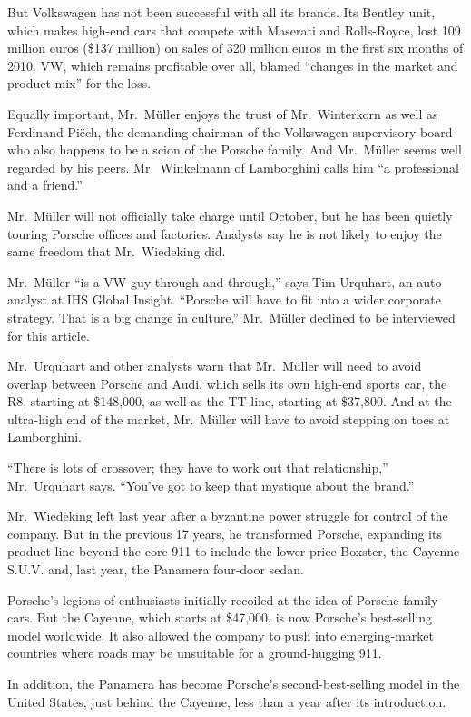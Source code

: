 ﻿\documentclass[12pt]{article}
\begin{document}
But Volkswagen has not been successful with all its brands. Its Bentley unit, which makes high-end
cars that compete with Maserati and Rolls-Royce, lost 109 million euros (\$137 million) on sales of
320 million euros in the first six months of 2010. VW, which remains profitable over all, blamed
``changes in the market and product mix'' for the loss.

Equally important, Mr.~Müller enjoys the trust of Mr.~Winterkorn as well as Ferdinand Pi\"ech, the
demanding chairman of the Volkswagen supervisory board who also happens to be a scion of the Porsche
family. And Mr.~Müller seems well regarded by his peers. Mr.~Winkelmann of Lamborghini calls him
``a professional and a friend.''

Mr.~Müller will not officially take charge until October, but he has been quietly touring Porsche
offices and factories. Analysts say he is not likely to enjoy the same freedom that Mr.~Wiedeking
did.

Mr.~Müller ``is a VW guy through and through,'' says Tim Urquhart, an auto analyst at IHS Global
Insight. ``Porsche will have to fit into a wider corporate strategy. That is a big change in
culture.'' Mr.~Müller declined to be interviewed for this article.

Mr.~Urquhart and other analysts warn that Mr.~Müller will need to avoid overlap between Porsche and
Audi, which sells its own high-end sports car, the R8, starting at \$148,000, as well as the TT
line, starting at \$37,800. And at the ultra-high end of the market, Mr.~Müller will have to avoid
stepping on toes at Lamborghini.

``There is lots of crossover; they have to work out that relationship,'' Mr.~Urquhart says. ``You've
got to keep that mystique about the brand.''

Mr.~Wiedeking left last year after a byzantine power struggle for control of the company. But in the
previous 17 years, he transformed Porsche, expanding its product line beyond the core 911 to include
the lower-price Boxster, the Cayenne S.U.V. and, last year, the Panamera four-door sedan.

Porsche's legions of enthusiasts initially recoiled at the idea of Porsche family cars. But the
Cayenne, which starts at \$47,000, is now Porsche's best-selling model worldwide. It also allowed
the company to push into emerging-market countries where roads may be unsuitable for a
ground-hugging 911.

In addition, the Panamera has become Porsche's second-best-selling model in the United States, just
behind the Cayenne, less than a year after its introduction.
\end{document}

